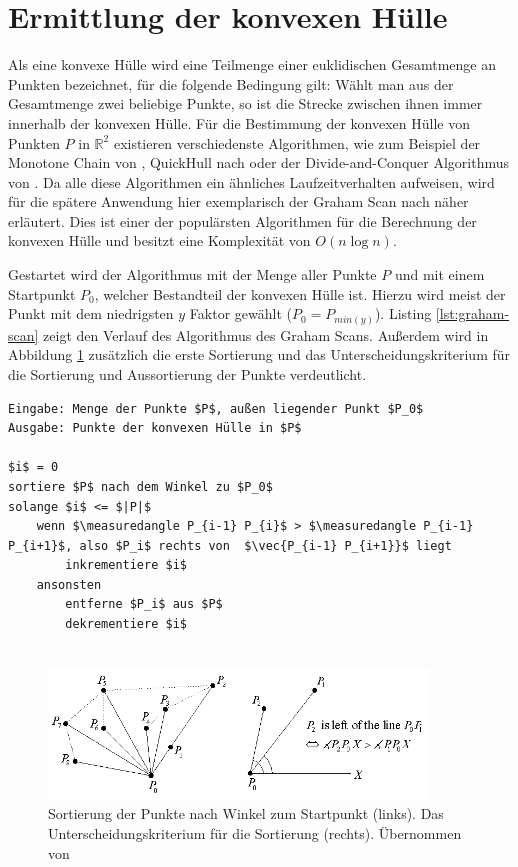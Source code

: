 \section{Ermittlung der konvexen Hülle}

Als eine konvexe Hülle wird eine Teilmenge einer euklidischen Gesamtmenge an Punkten bezeichnet, für die folgende Bedingung gilt: Wählt man aus der Gesamtmenge zwei beliebige Punkte, so ist die Strecke zwischen ihnen immer innerhalb der konvexen Hülle. Für die Bestimmung der konvexen Hülle von Punkten \(P\) in \( \mathbb{R}^2\) existieren verschiedenste Algorithmen, wie zum Beispiel der Monotone Chain von \citet{andrew1979another}, QuickHull nach \citet{eddy1977new} oder der Divide-and-Conquer Algorithmus von \citet{preparata1985convex}. Da alle diese Algorithmen ein ähnliches Laufzeitverhalten aufweisen, wird für die spätere Anwendung hier exemplarisch der Graham Scan nach \citet{graham1972efficient} näher erläutert. Dies ist einer der populärsten Algorithmen für die Berechnung der konvexen Hülle und besitzt eine Komplexität von \(O(n \log n)\).

Gestartet wird der Algorithmus mit der Menge aller Punkte \(P\) und mit einem Startpunkt \(P_0\), welcher Bestandteil der konvexen Hülle ist. Hierzu wird meist der Punkt mit dem niedrigsten \(y\) Faktor gewählt (\(P_0=P_{min(y)}\)). Listing \ref{lst:graham-scan} zeigt den Verlauf des Algorithmus des Graham Scans. Außerdem wird in Abbildung \ref{fig:convexhull} zusätzlich die erste Sortierung und das Unterscheidungskriterium für die Sortierung und Aussortierung der Punkte verdeutlicht. \citep{convexHull} 


\begin{lstlisting}[mathescape,caption=Graham Scan Algorithmus, label=lst:graham-scan, float=htbp]
Eingabe: Menge der Punkte $P$, außen liegender Punkt $P_0$
Ausgabe: Punkte der konvexen Hülle in $P$

$i$ = 0
sortiere $P$ nach dem Winkel zu $P_0$
solange $i$ <= $|P|$
    wenn $\measuredangle P_{i-1} P_{i}$ > $\measuredangle P_{i-1} P_{i+1}$, also $P_i$ rechts von  $\vec{P_{i-1} P_{i+1}}$ liegt
        inkrementiere $i$
    ansonsten
        entferne $P_i$ aus $P$
        dekrementiere $i$
    
\end{lstlisting} 

\begin{figure}[h]
  \centering
	\includegraphics[width=0.9\textwidth]{content/images/methods/convexhull.png} 
  \caption{Sortierung der Punkte nach Winkel zum Startpunkt (links). Das Unterscheidungskriterium für die Sortierung (rechts). Übernommen von \citet{convexHull}}
  \label{fig:convexhull}
\end{figure}
